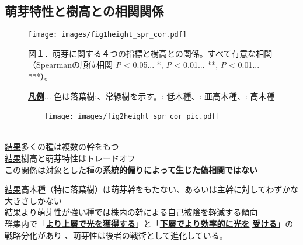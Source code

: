 \documentclass[a0, 30pt, plainboxedsections]{sciposter} %
\renewcommand{\baselinestretch}{1.2}
\begin{document}
\begin{multicols}{2}
\begin{mdframed}[style=subsection.frame,frametitle=\textbf{\LARGE{\ding{193}}\Large{樹高が高くなるほど萌芽性が強くなる}}]
\subsection*{萌芽特性と樹高との相関関係}

\begin{figure}
	\centering
		\texttt{[image: images/fig1height\_spr\_cor.pdf]} %
		
	{\tiny 図１．萌芽に関する４つの指標と樹高との関係。すべて有意な相関（Spearmanの順位相関 \textit{P} < 0.05... *, \textit{P} < 0.01... **, \textit{P} < 0.01... ***）。
   
   \textbf{\underline{凡例}}... 色は\textcolor{Orange1}{落葉樹}:、\textcolor{Blue1}{常緑樹}を示す。: 低木種、: 亜高木種、: 高木種}
\end{figure}

\begin{figure}
	\centering\hspace{-2em}
	　　\texttt{[image: images/fig2height\_spr\_cor\_pic.pdf]}\\
	　　
	　　\hspace{-2em}{\tiny 図２．系統独立対比による萌芽特性と樹高との関係。萌芽幹RBAを除いて相関は有意}
\end{figure}

\end{mdframed}

\renewcommand{\baselinestretch}{1.2}
\begin{mdframed}[style=conclusion.frame,frametitle={\textbf{\large{\faFlagAlt \vspace{0.02em} 結論: {萌芽性は最大樹高と相反して発達しており、群集の中に多様な萌芽性をもつ種が存在する}}}}]
  \vspace{0.4em}
  \flushleft
  \normalsize{\underline{結果}多くの種は複数の幹をもつ\\
  \underline{結果}樹高と萌芽特性はトレードオフ\\
  }
  \large{\faHandLeft \vspace{0.02em} この関係は対象とした種の\textbf{\underline{系統的偏りによって生じた偽相関ではない}}}
  
  \vspace{0.4em}
  \normalsize{\underline{結果}高木種（特に落葉樹）は萌芽幹をもたない、あるいは主幹に対してわずかな大きさしかない\\
  \underline{結果}より萌芽性が強い種では株内の幹による自己被陰を軽減する傾向\\
  }
  \large{\faHandLeft \vspace{0.02em}  群集内で「\textbf{\underline{より上層で光を獲得する}}」と「\textbf{\underline{下層でより効率的に光を}} \textbf{\underline{受ける}}」の戦略分化があり
  、萌芽性は後者の戦術として進化している。}
 
\end{mdframed}

\end{multicols}

\end{document}
